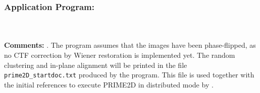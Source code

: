 \subsubsection{Application Program: }
\label{prime2D_init}
\\\\
\noindent\textbf{Comments:} . The program assumes that the images have been phase-flipped, as no CTF correction by Wiener restoration is implemented yet. The random clustering and in-plane alignment will be printed in the file \texttt{prime2D\_startdoc.txt} produced by the program. This file is used together with the initial references to execute PRIME2D in distributed mode by .

